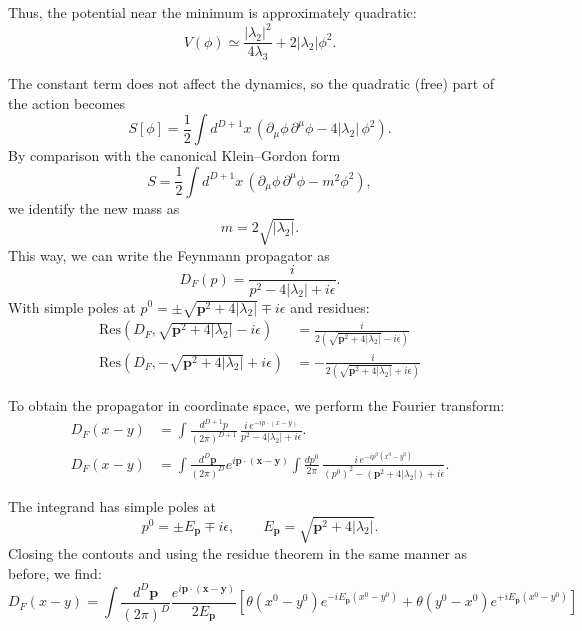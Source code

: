 \documentclass[12pt]{article}
\begin{document}
Thus, the potential near the minimum is approximately quadratic:
\begin{equation}
    V(\phi) \simeq \frac{|\lambda_2|^2}{4\lambda_3} + 2|\lambda_2|\phi^2.
\end{equation}

The constant term does not affect the dynamics, so the quadratic (free) part of the action becomes
\begin{equation}
    S[\phi] = \frac{1}{2}\int d^{D+1}x\,\left( \partial_\mu\phi\,\partial^\mu\phi - 4|\lambda_2|\,\phi^2 \right).
\end{equation}
By comparison with the canonical Klein–Gordon form
\[
    S = \frac{1}{2}\int d^{D+1}x\,\left( \partial_\mu\phi\,\partial^\mu\phi - m^2\phi^2 \right),
\]
we identify the new mass as
\begin{equation}
    m = 2\sqrt{|\lambda_2|}.
\end{equation}
This way, we can write the Feynmann propagator as 
\begin{equation*}
    D_F(p) = \frac{i}{p^2 - 4|\lambda_2| + i\epsilon}.
\end{equation*}
With simple poles at $p^0 = \pm \sqrt{\mathbf{p}^2 + 4|\lambda_2|} \mp i\epsilon$ and residues:
\begin{align*}
    \text{Res}(D_F, \sqrt{\mathbf{p}^2 + 4|\lambda_2|} - i\epsilon) &= \frac{i}{2(\sqrt{\mathbf{p}^2 + 4|\lambda_2|} - i\epsilon)} \\
    \text{Res}(D_F, -\sqrt{\mathbf{p}^2 + 4|\lambda_2|} + i\epsilon) &= -\frac{i}{2(\sqrt{\mathbf{p}^2 + 4|\lambda_2|} + i\epsilon)}
\end{align*}

To obtain the propagator in coordinate space, we perform the Fourier transform:
\begin{align*}
    D_F(x - y) &= \int \frac{d^{D+1}p}{(2\pi)^{D+1}} \,
    \frac{i\,e^{-ip\cdot(x - y)}}{p^2 - 4|\lambda_2| + i\epsilon}. \\
    D_F(x - y) &=
    \int \frac{d^D\mathbf{p}}{(2\pi)^D} e^{i\mathbf{p}\cdot(\mathbf{x} - \mathbf{y})}
    \int \frac{dp^0}{2\pi} \,
    \frac{i\,e^{-ip^0(x^0 - y^0)}}{(p^0)^2 - (\mathbf{p}^2 + 4|\lambda_2|) + i\epsilon}.
\end{align*}

The integrand has simple poles at
\[
    p^0 = \pm E_{\mathbf{p}} \mp i\epsilon, \qquad
    E_{\mathbf{p}} = \sqrt{\mathbf{p}^2 + 4|\lambda_2|}.
\]
Closing the contouts and using the residue theorem in the same manner as before, we find:
\begin{equation}
    \boxed{D_F(x - y)
    = \int \frac{d^D\mathbf{p}}{(2\pi)^D}
    \frac{e^{i\mathbf{p}\cdot(\mathbf{x} - \mathbf{y})}}{2E_{\mathbf{p}}}
    \left[
        \theta(x^0 - y^0) e^{-iE_{\mathbf{p}}(x^0 - y^0)}
        + \theta(y^0 - x^0) e^{+iE_{\mathbf{p}}(x^0 - y^0)}
    \right]}
\end{equation}
\end{document}
